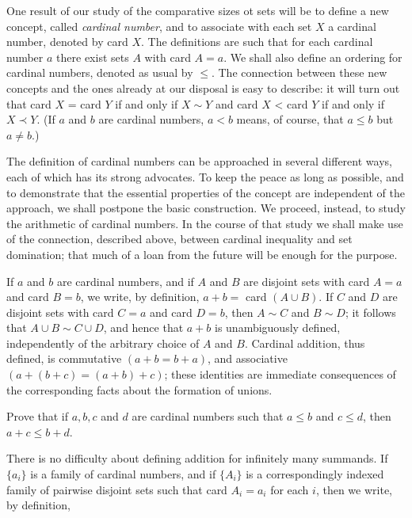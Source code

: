 
One result of our study of the comparative sizes ot sets will be to define a new concept, called \textit{cardinal number}, and to associate with each set $X$ a cardinal number, denoted by card $X$. The definitions are such that for each cardinal number $a$ there exist sets $A$ with card $A = a$. We shall also define an ordering for cardinal numbers, denoted as usual by $\le$. The connection between these new concepts and the ones already at our disposal is easy to describe: it will turn out that card $X$ = card $Y$ if and only if $X \sim Y$ and card $X$ < card $Y$ if and only if $X \prec Y$. (If $a$ and $b$ are cardinal numbers, $a < b$ means, of course, that $a \le b$ but $a \neq b$.)

The definition of cardinal numbers can be approached in several different ways, each of which has its strong advocates. To keep the peace as long as possible, and to demonstrate that the essential properties of the concept are independent of the approach, we shall postpone the basic construction. We proceed, instead, to study the arithmetic of cardinal numbers. In the course of that study we shall make use of the connection, described above, between cardinal inequality and set domination; that much of a loan from the future will be enough for the purpose.

If $a$ and $b$ are cardinal numbers, and if $A$ and $B$ are disjoint sets with card $A = a$ and card $B = b$, we write, by definition, $a + b =$ card $(A \cup B)$. If $C$ and $D$ are disjoint sets with card $C = a$ and card $D = b$, then $A \sim C$ and $B \sim D$; it follows that $A \cup B \sim C \cup D$, and hence that $a + b$ is unambiguously defined, independently of the arbitrary choice of $A$ and $B$. Cardinal addition, thus defined, is commutative $(a + b = b + a)$, and associative $(a + (b + c) = (a + b) + c)$; these identities are immediate consequences of the corresponding facts about the formation of unions.

\begin{exercise} Prove that if $a, b, c$ and $d$ are cardinal numbers such that $a \le b$ and $c \le d$, then $a + c \le b + d$. 
\end{exercise}

There is no difficulty about defining addition for infinitely many summands. If $\{ a_{i} \}$ is a family of cardinal numbers, and if $\{ A_{i} \}$ is a correspondingly indexed family of pairwise disjoint sets such that card $A_{i} = a_{i}$ for each $i$, then we write, by definition,

